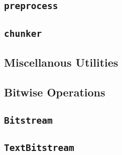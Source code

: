 
\subsection{\texttt{preprocess}}
\subsection{\texttt{chunker}}
\subsection{Miscellanous Utilities}
\subsection{Bitwise Operations}
\subsection{\texttt{Bitstream}}
\subsection{\texttt{TextBitstream}}
